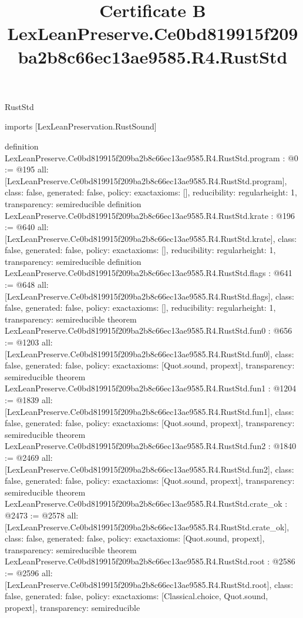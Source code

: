 \begin{lexlean}{RustStd}
\title{Certificate B LexLeanPreserve.Ce0bd819915f209ba2b8c66ec13ae9585.R4.RustStd}
\begin{coremodule}
imports [LexLeanPreservation.RustSound]

definition LexLeanPreserve.Ce0bd819915f209ba2b8c66ec13ae9585.R4.RustStd.program : @0 := @195 {
  all: [LexLeanPreserve.Ce0bd819915f209ba2b8c66ec13ae9585.R4.RustStd.program],
  class: false,
  generated: false,
  policy: exact{axioms: []},
  reducibility: regular{height: 1},
  transparency: semireducible
}
definition LexLeanPreserve.Ce0bd819915f209ba2b8c66ec13ae9585.R4.RustStd.krate : @196 := @640 {
  all: [LexLeanPreserve.Ce0bd819915f209ba2b8c66ec13ae9585.R4.RustStd.krate],
  class: false,
  generated: false,
  policy: exact{axioms: []},
  reducibility: regular{height: 1},
  transparency: semireducible
}
definition LexLeanPreserve.Ce0bd819915f209ba2b8c66ec13ae9585.R4.RustStd.flags : @641 := @648 {
  all: [LexLeanPreserve.Ce0bd819915f209ba2b8c66ec13ae9585.R4.RustStd.flags],
  class: false,
  generated: false,
  policy: exact{axioms: []},
  reducibility: regular{height: 1},
  transparency: semireducible
}
theorem LexLeanPreserve.Ce0bd819915f209ba2b8c66ec13ae9585.R4.RustStd.fun0 : @656 := @1203 {
  all: [LexLeanPreserve.Ce0bd819915f209ba2b8c66ec13ae9585.R4.RustStd.fun0],
  class: false,
  generated: false,
  policy: exact{axioms: [Quot.sound, propext]},
  transparency: semireducible
}
theorem LexLeanPreserve.Ce0bd819915f209ba2b8c66ec13ae9585.R4.RustStd.fun1 : @1204 := @1839 {
  all: [LexLeanPreserve.Ce0bd819915f209ba2b8c66ec13ae9585.R4.RustStd.fun1],
  class: false,
  generated: false,
  policy: exact{axioms: [Quot.sound, propext]},
  transparency: semireducible
}
theorem LexLeanPreserve.Ce0bd819915f209ba2b8c66ec13ae9585.R4.RustStd.fun2 : @1840 := @2469 {
  all: [LexLeanPreserve.Ce0bd819915f209ba2b8c66ec13ae9585.R4.RustStd.fun2],
  class: false,
  generated: false,
  policy: exact{axioms: [Quot.sound, propext]},
  transparency: semireducible
}
theorem LexLeanPreserve.Ce0bd819915f209ba2b8c66ec13ae9585.R4.RustStd.crate_ok : @2473 := @2578 {
  all: [LexLeanPreserve.Ce0bd819915f209ba2b8c66ec13ae9585.R4.RustStd.crate_ok],
  class: false,
  generated: false,
  policy: exact{axioms: [Quot.sound, propext]},
  transparency: semireducible
}
theorem LexLeanPreserve.Ce0bd819915f209ba2b8c66ec13ae9585.R4.RustStd.root : @2586 := @2596 {
  all: [LexLeanPreserve.Ce0bd819915f209ba2b8c66ec13ae9585.R4.RustStd.root],
  class: false,
  generated: false,
  policy: exact{axioms: [Classical.choice, Quot.sound, propext]},
  transparency: semireducible
}


\end{coremodule}
\end{lexlean}
